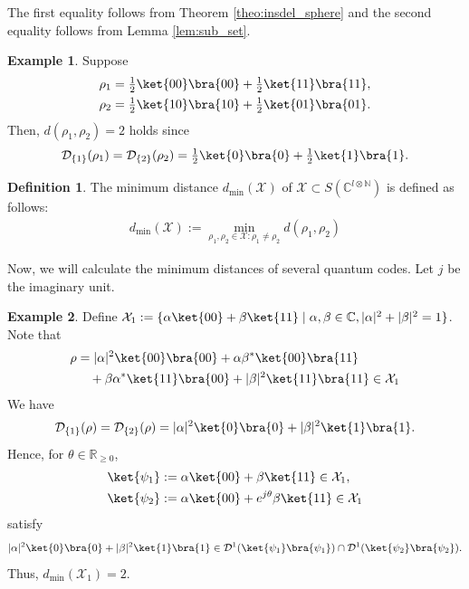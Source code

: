 \documentclass[reprint,amsmath,amssymb,aps,]{revtex4-2}
\theoremstyle{definition}
\newtheorem{defi}{Definition}
\newtheorem{exam}{Example}
\newcommand{\SET}[1]{\mathbb{#1}}
\newcommand{\NNR}{\SET{R}_{\ge 0}}
\newcommand{\N}{\SET{N}}
\newcommand{\C}{\SET{C}}
\newcommand{\1}{\mbox{1}\hspace{-0.25em}\mbox{l}}%
\newcommand{\pure}[2]{\C^{#1 \otimes #2}}
\newcommand{\state}[2]{S(\pure{#1}{#2})}
\newcommand{\QU}[1]{\mathcal{#1}}
\begin{document}
The first equality
follows
from Theorem \ref{theo:insdel_sphere}
and
the second equality
follows
from Lemma \ref{lem:sub_set}.

\begin{exam}
  Suppose
  \begin{align*}
    \rho_1
    &=
    \tfrac{1}{2}
    \ket{00}\bra{00}
    +
    \tfrac{1}{2}
    \ket{11}\bra{11},\\
    \rho_2
    &=
    \tfrac{1}{2}
    \ket{10}\bra{10}
    +
    \tfrac{1}{2}
    \ket{01}\bra{01}.
  \end{align*}
  Then,
  $d( \rho_1, \rho_2 ) = 2$ holds
  since
  \begin{align*}
    \QU{D}_{\{ 1 \}}(\rho_1)
    =
    \QU{D}_{\{ 2 \}}(\rho_2)
    =
    \tfrac{1}{2}\ket{0}\bra{0}
    +
    \tfrac{1}{2}\ket{1}\bra{1}.
  \end{align*} 
\end{exam}

\begin{defi}
  The minimum distance $d_{\text{min}}(\QU{X})$ of $\QU{X} \subset \state{l}{\N}$
  is defined as follows:
  \begin{align*}
    d_{\text{min}}(\QU{X})
    :=
    \min_{ \rho_1, \rho_2 \in \QU{X} : \rho_1 \neq \rho_2 }
    d( \rho_1, \rho_2 )
  \end{align*}
\end{defi}

Now,
we will calculate the minimum distances of several quantum codes.
Let $j$ be the imaginary unit.

\begin{exam}
  Define
  $\QU{X}_1 := \{ \alpha \ket{00} + \beta \ket{11} \mid \alpha,\beta \in \C, |\alpha|^2+|\beta|^2 = 1 \}$.
  Note that
  \begin{align*}
    \rho
    &=
    |\alpha|^2 \ket{00}\bra{00} + \alpha\beta^* \ket{00}\bra{11}\\
    &~~~+
    \beta\alpha^* \ket{11}\bra{00} + |\beta|^2 \ket{11}\bra{11}
    \in \QU{X}_1
  \end{align*}
  We have
  \begin{align*}
    \QU{D}_{\{1\}}(\rho)
    =
    \QU{D}_{\{2\}}(\rho)
    =
    |\alpha|^2 \ket{0}\bra{0} + |\beta|^2 \ket{1}\bra{1}.
  \end{align*}
  Hence,
  for $\theta \in \NNR$,
  \begin{align*}
    \ket{\psi_1}
    &:=
    \alpha \ket{00} + \beta \ket{11} \in \QU{X}_1,\\
    \ket{\psi_2}
    &:=
    \alpha \ket{00} + e^{j \theta}\beta \ket{11} \in \QU{X}_1
  \end{align*}
  satisfy
  \begin{align*}
    |\alpha|^2 \ket{0}\bra{0} + |\beta|^2 \ket{1}\bra{1}
    \in
    \QU{D}^1(\ket{\psi_1}\bra{\psi_1})
    \cap
    \QU{D}^1(\ket{\psi_2}\bra{\psi_2}).
  \end{align*}
  Thus, $d_{\text{min}}(\QU{X}_1) = 2$.
\end{exam}
\end{document}
